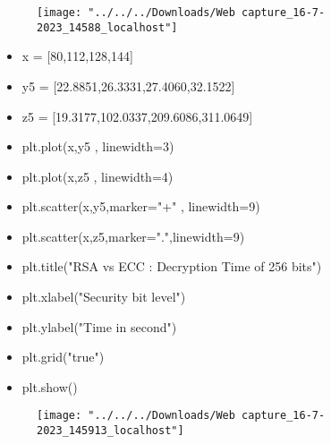 \documentclass[12pt,a4paper]{article}
\begin{document}
\begin{figure}[h]
	\centering
	\texttt{[image: "../../../Downloads/Web capture\_16-7-2023\_14588\_localhost"]}
\end{figure}

	
	
	\newpage
	\begin{itemize}
		\item 	x = [80,112,128,144]
		\item y5 = [22.8851,26.3331,27.4060,32.1522]
		\item z5 = [19.3177,102.0337,209.6086,311.0649]
			\item plt.plot(x,y5 , linewidth=3)
		\item plt.plot(x,z5 , linewidth=4)
		\item plt.scatter(x,y5,marker="+" , linewidth=9)
		\item plt.scatter(x,z5,marker=".",linewidth=9)
		\item plt.title("RSA vs ECC : Decryption Time of 256 bits")
		\item plt.xlabel("Security bit level")
		\item plt.ylabel("Time in second")
		\item plt.grid("true")
		\item plt.show()
		
	\end{itemize}

\begin{figure}[h]
	\centering
	\texttt{[image: "../../../Downloads/Web capture\_16-7-2023\_145913\_localhost"]}
\end{figure}

	

	
	
	
	
	
	
	\newpage
	
\end{document}
